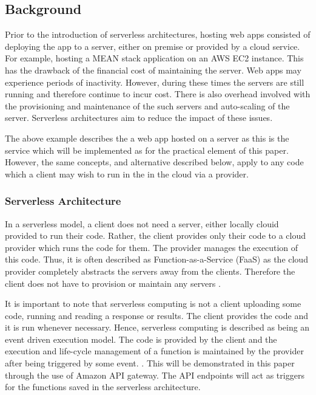     \subsection{Background} 
    Prior to the introduction of serverless architectures, hosting web apps consisted of deploying the app to a server, either on premise or provided by a cloud service. For example, hosting a MEAN stack application on an AWS EC2 instance. This has the drawback of the financial cost of maintaining the server. Web apps may experience periods of inactivity. However, during these times the servers are still running and therefore continue to incur cost. There is also overhead involved with the provisioning and maintenance of the such servers and auto-scaling of the server. Serverless architectures aim to reduce the impact of these issues.
    
    The above example describes the a web app hosted on a server as this is the service which will be implemented as for the practical element of this paper. However, the same concepts, and alternative described below, apply to any code which a client may wish to run in the in the cloud via a provider.
    
      \subsubsection{Serverless Architecture}
      In a serverless model, a client does not need a server, either locally clouid provided to run  their code. Rather, the client provides only their code to a cloud provider which runs the code for them. The provider manages the execution of this code. Thus, it is often described as Function-as-a-Service (FaaS) as the cloud provider completely abstracts the servers away from the clients. Therefore the client does not have to provision or maintain any servers \citep{stackify}.
      
      It is important to note that serverless computing is not a client uploading some code, running and reading a response or results. The client provides the code and it is run whenever necessary. Hence, serverless computing is described as being an event driven execution model. The code is provided by the client and the execution and life-cycle management of a function is maintained by the provider after being triggered by some event. \citep{kanso}. This will be demonstrated in this paper through the use of Amazon API gateway. The API endpoints will act as  triggers for the functions saved in the serverless architecture.
      
